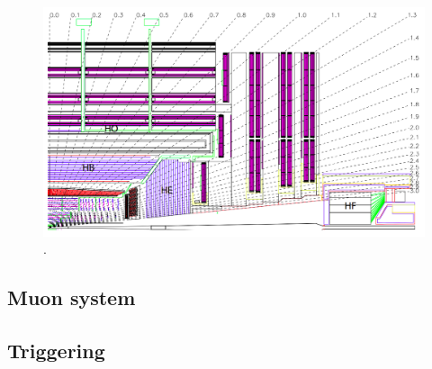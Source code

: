 \begin{figure}[!hbtp]
    \centering
    \includegraphics[width=\textwidth]{Figures/HCAL.png}
    \caption{.}
    \label{fig:}
\end{figure}

\subsection{Muon system}
\subsection{Triggering}


